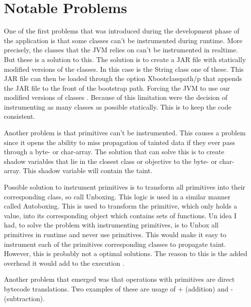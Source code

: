 \section{Notable Problems}
\label{NotableProblems}
One of the first problems that was introduced during the development phase of the application is that some classes can't be instrumented during runtime. More precisely, the classes that the JVM relies on can't be instrumented in realtime. But these is a solution to this. The solution is to create a JAR file with statically modified versions of the classes. In this case is the String class one of these. This JAR file can then be loaded through the option Xbootclasspath/p that appends the JAR file to the front of the bootstrap path. Forcing the JVM to use our modified versions of classes \parencite{xboot}. Because of this limitation were the decision of instrumenting as many classes as possible statically. This is to keep the code consistent.

Another problem is that primitives can't be instrumented. This causes a problem since it opens the ability to miss propagation of tainted data if they ever pass through a byte- or char-array. The solution that can solve this is to create shadow variables that lie in the closest class or objective to the byte- or char-array. This shadow variable will contain the taint.

Possible solution to instrument primitives is to transform all primitives into their corresponding class, so call Unboxing. This logic is used in a similar manner called Autoboxing. This is used to transform the primitive, which only holds a value, into its corresponding object which contains sets of functions. Un idea I had, to solve the problem with instrumenting primitives, is to Unbox all primitives in runtime and never use primitives. This would make it easy to instrument each of the primitives corresponding classes to propagate taint. However, this is probably not a optimal solutions. The reason to this is the added overhead it would add to the execution \parencite{BlochJoshua2008EJ}. 

Another problem that emerged was that operations with primitives are direct bytecode translations. Two examples of these are usage of + (addition) and - (subtraction).

